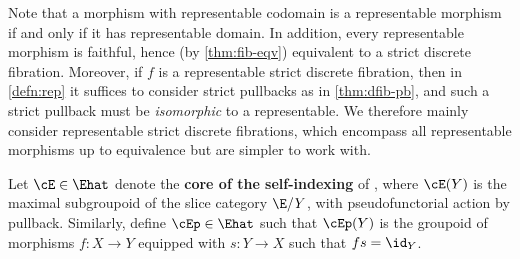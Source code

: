Note that a morphism with representable codomain is a representable morphism if and only if it has representable domain.
In addition, every representable morphism is faithful, hence (by \cref{thm:fib-eqv}) equivalent to a strict discrete fibration.
Moreover, if $f$ is a representable strict discrete fibration, then in \cref{defn:rep} it suffices to consider strict pullbacks as in \cref{thm:dfib-pb}, and such a strict pullback \dP must be \emph{isomorphic} to a representable.
We therefore mainly consider representable strict discrete fibrations, which encompass all representable morphisms up to equivalence but are simpler to work with.

\begin{defn}
  Let $\cE\in\Ehat$ denote the \textbf{core of the self-indexing} of \E, where $\cE(Y)$ is the maximal subgroupoid of the slice category $\E/Y$, with pseudofunctorial action by pullback.
  Similarly, define $\cEp \in\Ehat$ such that $\cEp(Y)$ is the groupoid of morphisms $f:X\to Y$ equipped with $s:Y\to X$ such that $f s = \id_Y$.
\end{defn}

